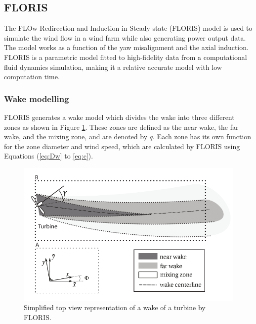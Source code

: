 
\subsection{FLORIS} \label{sec:floris} The FLOw Redirection and Induction in Steady state (FLORIS) model is used to simulate the wind flow in a wind farm while also generating power output data. The model works as a function of the yaw misalignment and the axial induction\cite{Gebraad2016}. FLORIS is a parametric model fitted to high-fidelity data from a computational fluid dynamics simulation, making it a relative accurate model with low computation time\cite{Dijk2016}. 

\subsubsection{Wake modelling}
\label{wakemodel}
FLORIS generates a wake model which divides the wake into three different zones as shown in Figure \ref{fig:wake}. These zones are defined as the near wake, the far wake, and the mixing zone, and are denoted by $q$. Each zone has its own function for the zone diameter and wind speed, which are calculated by FLORIS using Equations (\ref{eq:Dw} to \ref{eq:c}). 


\begin{figure}
  	\includegraphics[width=\linewidth]{./Figures/WakeFLORIS.png}
  	\caption{Simplified top view representation of a wake of a turbine by FLORIS.\cite{Gebraad2016}   }
	\label{fig:wake}
\end{figure}

